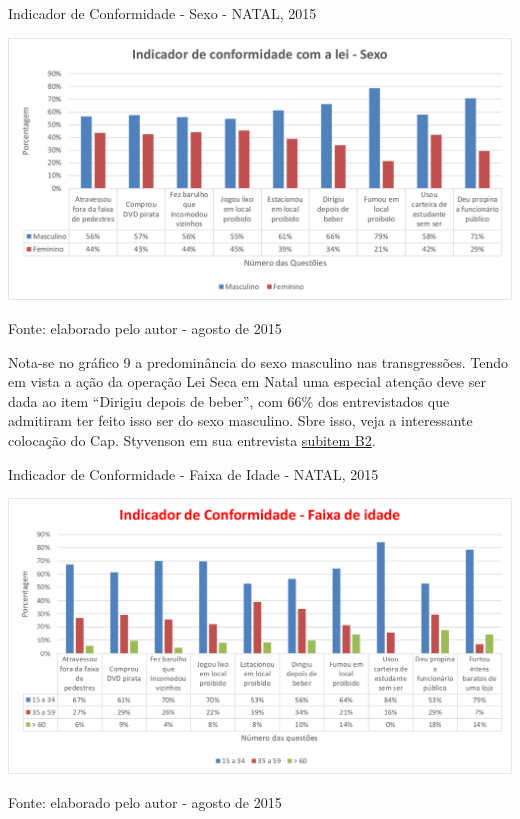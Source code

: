 \documentclass[
	12pt,				%
	openright,			%
	twoside,			%
	a4paper,			%
	chapter=TITLE,		%
	section=TITLE,		%
	subsection=TITLE,	%
	subsubsection=TITLE,%
	spanish,            %
	english,			%
	brazil				%
	]{abntex2}
\begin{document}
\begin{grafico}[!htpb]
	\caption{Indicador de Conformidade - Sexo - NATAL, 2015}
	\begin{center}
		\includegraphics[scale=0.5]{Conformidade-sexo.png}
	\end{center}
	\ABNTEXchapterfont\small{Fonte: elaborado pelo autor - agosto de 2015}
	\label{Conf_sexo}
\end{grafico}
\FloatBarrier
\par
Nota-se no gráfico 9 a predominância do sexo masculino nas transgressões. Tendo em vista a ação da operação Lei Seca em Natal uma especial atenção deve ser dada ao item “Dirigiu depois de beber”, com 66\% dos entrevistados que admitiram ter feito isso ser do sexo masculino. Sbre isso, veja a interessante colocação do Cap. Styvenson em sua entrevista \hyperlink{B2}{subitem B2}.
\begin{grafico}[!htpb]
	\caption{Indicador de Conformidade - Faixa de Idade - NATAL, 2015}
	\begin{center}
		\includegraphics[scale=0.5]{Conformidade-idade.png}
	\end{center}
	\ABNTEXchapterfont\small{Fonte: elaborado pelo autor - agosto de 2015}
	\label{Conf_idade}
\end{grafico}
\end{document}
